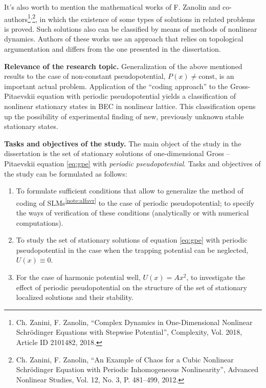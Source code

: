\documentclass[candidate, href, colorlinks]{disser}
\begin{document}
It's also worth to mention the mathematical works of F. Zanolin and co-authors\footnote{Ch. Zanini, F. Zanolin, ``Complex Dynamics in One-Dimensional Nonlinear Schr\"odinger Equations with Stepwise Potential'', Complexity, Vol. 2018, Article ID 2101482, 2018.}\textsuperscript{,}\footnote{Ch. Zanini, F. Zanolin, ``An Example of Chaos for a Cubic Nonlinear Schr\"odinger Equation with Periodic Inhomogeneous Nonlinearity'', Advanced Nonlinear Studies, Vol. 12, No. 3, P. 481--499, 2012.}, in which the existence of some types of solutions in related problems is proved.
Such solutions also can be classified by means of methods of nonlinear dynamics.
Authors of these works use an approach that relies on topological argumentation and differs from the one presented in the dissertation.

\textbf{Relevance of the research topic.}
Generalization of the above mentioned results to the case of non-constant pseudopotential, $P(x) \neq \mathrm{const}$, is an important actual problem.
Application of the ``coding approach'' to the Gross-Pitaevskii equation with periodic pseudopotential yields  a classification of nonlinear stationary states in BEC in nonlinear lattice.
This classification opens up the possibility of experimental finding of new, previously unknown stable stationary states.

\textbf{Tasks and objectives of the study.}
The main object of the study in the dissertation is the set of stationary solutions of one-dimensional Gross -- Pitaevskii equation \eqref{eq:gpe} with {\it periodic pseudopotential}.
Tasks and objectives of the study can be formulated as follows:
\begin{enumerate}
	\item To formulate sufficient conditions that allow to generalize the method of coding of SLMs\textsuperscript{\ref{note:alfavr}} to the case of periodic pseudopotential; to specify the ways of verification of these conditions (analytically or with numerical computations).
	\item To study the set of stationary solutions of equation \eqref{eq:gpe} with periodic pseudopotential in the case when the trapping potential can be neglected, $U(x) \equiv 0$.
	\item For the case of harmonic potential well, $U(x) = A x^2$, to investigate the effect of periodic pseudopotential on the structure of the set of stationary localized solutions and their stability.
\end{enumerate}
\end{document}
